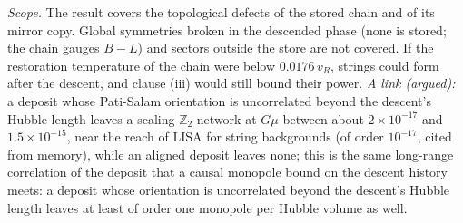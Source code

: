 \emph{Scope.} The result covers the topological defects of the stored chain and of its mirror copy. Global symmetries broken in the descended phase (none is stored; the chain gauges $B - L$) and sectors outside the store are not covered. If the restoration temperature of the chain were below $0.0176\,v_{R}$, strings could form after the descent, and clause (iii) would still bound their power. \emph{A link (argued):} a deposit whose Pati-Salam orientation is uncorrelated beyond the descent's Hubble length leaves a scaling $\mathbb{Z}_{2}$ network at $G\mu$ between about $2 \times 10^{-17}$ and $1.5 \times 10^{-15}$, near the reach of LISA for string backgrounds (of order $10^{-17}$, cited from memory), while an aligned deposit leaves none; this is the same long-range correlation of the deposit that a causal monopole bound on the descent history meets: a deposit whose orientation is uncorrelated beyond the descent's Hubble length leaves at least of order one monopole per Hubble volume as well.
